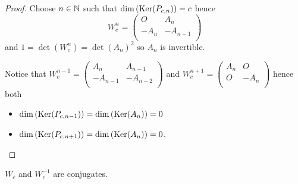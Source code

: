 \begin{proof}
  Choose $n\in\mathbb{N}$ such that $\dim\left(\operatorname{Ker}(P_{c,n})\right) = c$ hence
  \[
  W_{c}^{n}
  =
  \left(
  \begin{array}{cc}
     O    &  A_{n}  \\
    -A_{n} & -A_{n-1} \\
  \end{array}
  \right)
  \]
  and $1 = \det(W_{c}^{n}) = \det(A_{n})^{2}$ so $A_{n}$ is
  invertible.

  Notice that
  $W_{c}^{n-1} = \left(\begin{smallmatrix} A_{n} & A_{n-1} \\-A_{n-1} & -A_{n-2} \\\end{smallmatrix}\right)$
  and
  $W_{c}^{n+1} = \left(\begin{smallmatrix} A_{n} & O \\ O & -A_{n} \\\end{smallmatrix}\right)$
  hence both
  \begin{itemize}
    \item $\dim\left(\operatorname{Ker}(P_{c,n-1})\right) = \dim\left(\operatorname{Ker}(A_{n})\right) = 0$
    \item $\dim\left(\operatorname{Ker}(P_{c,n+1})\right) = \dim\left(\operatorname{Ker}(A_{n})\right) = 0$.
  \end{itemize}
\end{proof}

\begin{lemma}
  $W_{c}$ and $W_{c}^{-1}$ are conjugates.
\end{lemma}

